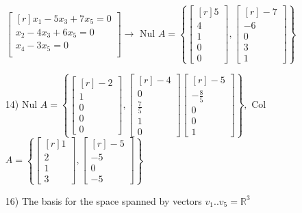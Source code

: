 \documentclass{article}
\begin{document}
\begin{enumerate}
      $\begin{bmatrix*}[r]
      x_1-5x_3+7x_5=0\\
      x_2-4x_3+6x_5=0\\
      x_4-3x_5=0\\
      \end{bmatrix*}\rightarrow
      $ Nul $A=\left\{\begin{bmatrix*}[r]
      5\\4\\1\\0\\0\end{bmatrix*},
      \begin{bmatrix*}[r]
      -7\\-6\\0\\3\\1\end{bmatrix*}\right\}$
    
    \item[14)]
      Nul $A = \left\{\begin{bmatrix*}[r]
      -2\\1\\0\\0\\0\end{bmatrix*},
      \begin{bmatrix*}[r]
      -4\\0\\\frac{7}{5}\\1\\0\end{bmatrix*}
      \begin{bmatrix*}[r]
      -5\\-\frac{8}{5}\\0\\0\\1\end{bmatrix*}
      \right\},
      $ Col $A=\left\{
      \begin{bmatrix*}[r]1\\2\\1\\3\end{bmatrix*},
      \begin{bmatrix*}[r]-5\\-5\\0\\-5\end{bmatrix*}
      \right\}$

    \item[16)]
      The basis for the space spanned by vectors $v_1..v_5=
      \mathbb{R}^3$


\end{enumerate}
\end{document}
